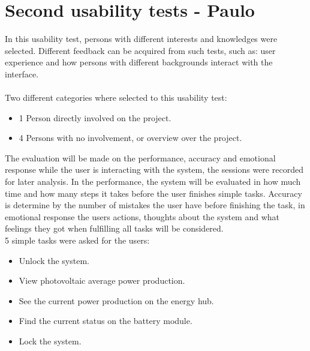 \section{Second usability tests - Paulo}

In this usability test, persons with different interests and knowledges were selected. Different feedback can be acquired from such tests, such as: user experience and how persons with different backgrounds interact with the interface.
\\
\\Two different categories where selected to this usability test:
\begin{itemize}
	\item 1 Person directly involved on the project.
	\item 4 Persons with no involvement, or overview over the project.
\end{itemize}
The evaluation will be made on the performance, accuracy and emotional response while the user is interacting with the system, the sessions were recorded for later analysis.\p
In the performance, the system will be evaluated in how much time and how many steps it takes before the user finishes simple tasks. Accuracy is determine by the number of mistakes the user have before finishing the task, in emotional response the users actions, thoughts about the system and what feelings they got when fulfilling all tasks will be considered.\p
\\ 5 simple tasks were asked for the users:
\begin{itemize}
	\item Unlock the system.
	\item View photovoltaic average power production.
	\item See the current power production on the energy hub.
	\item Find the current status on the battery module.
	\item Lock the system.
\end{itemize}

